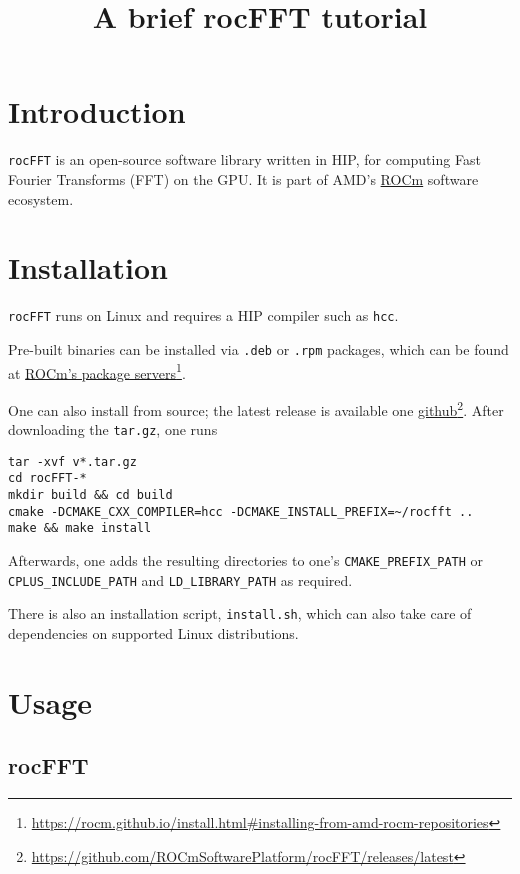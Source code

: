 \documentclass[10pt]{article}
\title{A brief rocFFT tutorial}
\date{}
\renewcommand{\(}{\left(}
\renewcommand{\)}{\right)}
\begin{document}
\maketitle

\section{Introduction}

\texttt{rocFFT} is an open-source software library written in HIP, for
computing Fast Fourier Transforms (FFT) on the GPU. It is part of
AMD's \href{https://github.com/RadeonOpenCompute}{ROCm} software
ecosystem.

\section{Installation}

\texttt{rocFFT} runs on Linux and requires a HIP compiler such as
\texttt{hcc}.

Pre-built binaries can be installed via \texttt{.deb} or \texttt{.rpm}
packages, which can be found at
\href{https://rocm.github.io/install.html#installing-from-amd-rocm-repositories}{ROCm's
  package servers}\footnote{\url{https://rocm.github.io/install.html\#installing-from-amd-rocm-repositories}}.

One can also install from source; the latest release is available one
\href{https://github.com/ROCmSoftwarePlatform/rocFFT/releases/latest}{github}\footnote{\url{https://github.com/ROCmSoftwarePlatform/rocFFT/releases/latest}}.
After downloading the \texttt{tar.gz}, one runs
\begin{verbatim}
tar -xvf v*.tar.gz
cd rocFFT-*
mkdir build && cd build
cmake -DCMAKE_CXX_COMPILER=hcc -DCMAKE_INSTALL_PREFIX=~/rocfft ..
make && make install
\end{verbatim}
Afterwards, one adds the resulting directories to one's
\texttt{CMAKE_PREFIX_PATH} or \texttt{CPLUS_INCLUDE_PATH} and
\texttt{LD_LIBRARY_PATH} as required.

There is also an installation script, \texttt{install.sh}, which can
also take care of dependencies on supported Linux distributions.

\section{Usage}

\subsection{rocFFT}
\end{document}

